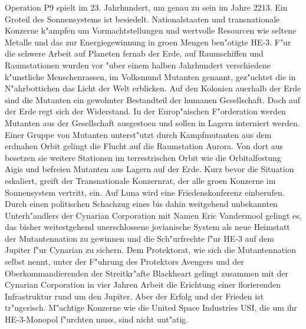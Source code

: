 \newchapter{\@introchaptername}

Operation P9 spielt im 23. Jahrhundert, um genau zu sein im Jahre 2213. Ein Gro\3teil des Sonnensystems ist besiedelt. Nationalstaaten und transnationale Konzerne k"ampfen um Vormachtstellungen und wertvolle Resourcen wie seltene Metalle und das zur Energiegewinnung in gro\3en Mengen ben"otigte HE-3. F"ur die schwere Arbeit auf Planeten fernab der Erde, auf Raumschiffen und Raumstationen wurden vor "uber einem halben Jahrhundert verschiedene k"unstliche Menschenrassen, im Volksmund Mutanten genannt, gez"uchtet die in N"ahrbottichen das Licht der Welt erblicken. Auf den Kolonien au\3erhalb der Erde sind die Mutanten ein gewohnter Bestandteil der humanen Gesellschaft. Doch auf der Erde regt sich der Widerstand. In der Europ"aischen F"orderation werden Mutanten aus der Gesellschaft ausgesto\3en und sollen in Lagern interniert werden. Einer Gruppe von Mutanten unterst"utzt durch Kampfmutanten aus dem erdnahen Orbit gelingt die Flucht auf die Raumstation Aurora. Von dort aus besetzen sie weitere Stationen im terrestrischen Orbit wie die Orbitalfestung Aigis und befreien Mutanten aus Lagern auf der Erde. Kurz bevor die Situation eskaliert, greift der Transnationale Konzernrat, der alle gro\3en Konzerne im Sonnensystem vertritt, ein. Auf Luna wird eine Friedenskonferenz einberufen. Durch einen politischen Schachzug eines bis dahin weitgehend unbekannten Unterh"andlers der Cynarian Corporation mit Namen Eric Vandermool gelingt es, das bisher weitestgehend unerschlossene jovianische System als neue Heimstatt der Mutantennation zu gewinnen und die Sch"urfrechte f"ur HE-3 auf dem Jupiter f"ur Cynarian zu sichern. Dem Protektorat, wie sich die Mutantennation selbst nennt, unter der F"uhrung des Protektors Avengers und der Oberkommandierenden der Streitkr"afte Blackheart gelingt zusammen mit der Cynarian Corporation in vier Jahren Arbeit die Erichtung einer florierenden Infrastruktur rund um den Jupiter. Aber der Erfolg und der Frieden ist tr"ugerisch. M"achtige Konzerne wie die United Space Industries USI, die um ihr HE-3-Monopol f"urchten muss, sind nicht unt"atig.